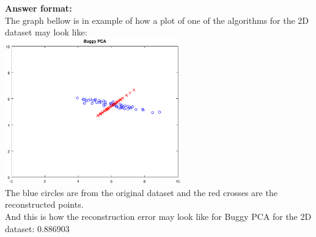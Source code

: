 \documentclass[a4paper]{article}
\newcounter{thm}
\theoremstyle{definition}
\begin{document}

\vspace{0.2in}

\textbf{Answer format:}  \\
The graph bellow is in example of how a plot of one of the algorithms for the 2D dataset may look like: \\
\includegraphics[width=3in]{buggy_pca} \hspace{0.4in}
\\

The blue circles are from the original dataset and the red crosses are the reconstructed points. \\

And this is how the reconstruction error may look like for Buggy PCA for the 2D dataset: 0.886903








\end{document}
